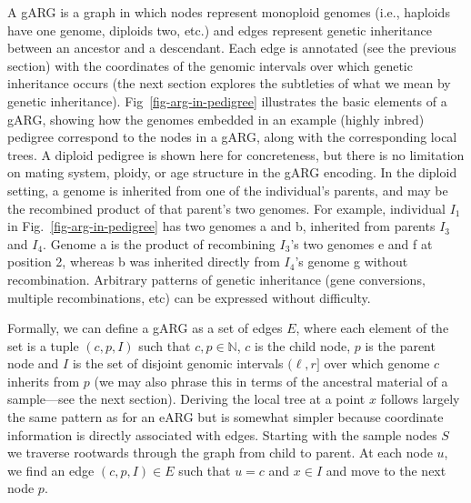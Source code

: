 \documentclass{article}
\begin{document}
A gARG is a graph in which nodes represent monoploid genomes (i.e.,
haploids have one genome, diploids two, etc.) and edges represent
genetic inheritance between an ancestor and a descendant.
Each edge is annotated (see the previous section) with the coordinates
of the genomic intervals over which genetic inheritance occurs
(the next section explores the subtleties of what we mean by
genetic inheritance).
Fig~\ref{fig-arg-in-pedigree} illustrates the basic elements of a gARG,
showing how the genomes embedded in an example (highly inbred)
pedigree correspond to the nodes in a gARG, along with the corresponding
local trees.
A diploid pedigree is shown here for concreteness, but
there is no limitation on mating system, ploidy, or age structure
in the gARG encoding.
In the diploid setting, a genome is inherited from one
of the individual's parents,
and may be the recombined product of that parent's two genomes.
For example, individual $I_1$ in Fig.~\ref{fig-arg-in-pedigree}
has two genomes \textsf{a} and \textsf{b},
inherited from parents $I_3$ and $I_4$. Genome \textsf{a} is the product of
recombining $I_3$'s two genomes \textsf{e} and \textsf{f} at position 2,
whereas \textsf{b} was inherited directly from $I_4$'s genome \textsf{g} without
recombination.
Arbitrary patterns of genetic inheritance (gene conversions, multiple recombinations,
etc) can be expressed without difficulty.

Formally, we can define a gARG as a set of edges $E$, where each
element of the set is a tuple $(c, p, I)$ such that $c, p \in \mathbb{N}$,
$c$ is the child node, $p$ is the parent node and $I$ is the set of
disjoint genomic intervals $(\ell, r]$ over which genome $c$ inherits from $p$ (we may
also phrase this in terms of the ancestral material of a sample---see
the next section).
Deriving the local tree at a point $x$
follows largely the same pattern as for an eARG but is somewhat
simpler because coordinate information is directly associated with
edges. Starting with the sample nodes $S$ we traverse
rootwards through the graph from child to parent. At each node $u$, we find an
edge $(c, p, I) \in E$ such that $u = c$ and $x \in I$
and move to the next node $p$.
\end{document}

